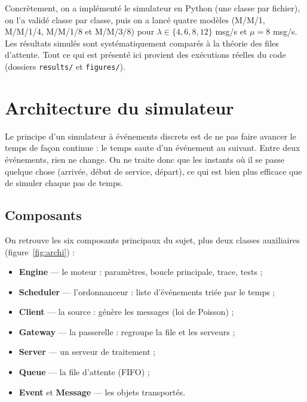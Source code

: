 \documentclass[11pt,a4paper]{article}
\begin{document}
Concrètement, on a implémenté le simulateur en Python (une classe par fichier),
on l'a validé classe par classe, puis on a lancé quatre modèles
(M/M/1, M/M/1/4, M/M/1/8 et M/M/3/8) pour $\lambda \in \{4,6,8,12\}$ msg/s et
$\mu = 8$ msg/s. Les résultats simulés sont systématiquement comparés à la
théorie des files d'attente. Tout ce qui est présenté ici provient des
exécutions réelles du code (dossiers \texttt{results/} et \texttt{figures/}).

\section{Architecture du simulateur}
Le principe d'un simulateur à événements discrets est de ne pas faire avancer le
temps de façon continue : le temps \og saute\fg{} d'un événement au suivant. Entre
deux événements, rien ne change. On ne traite donc que les instants où il se
passe quelque chose (arrivée, début de service, départ), ce qui est bien plus
efficace que de simuler chaque pas de temps.

\subsection{Composants}
On retrouve les six composants principaux du sujet, plus deux classes
auxiliaires (figure~\ref{fig:archi}) :
\begin{itemize}
  \item \textbf{Engine} --- le moteur : paramètres, boucle principale, trace, tests ;
  \item \textbf{Scheduler} --- l'ordonnanceur : liste d'événements triée par le temps ;
  \item \textbf{Client} --- la source : génère les messages (loi de Poisson) ;
  \item \textbf{Gateway} --- la passerelle : regroupe la file et les serveurs ;
  \item \textbf{Server} --- un serveur de traitement ;
  \item \textbf{Queue} --- la file d'attente (FIFO) ;
  \item \textbf{Event} et \textbf{Message} --- les objets transportés.
\end{itemize}
\end{document}
